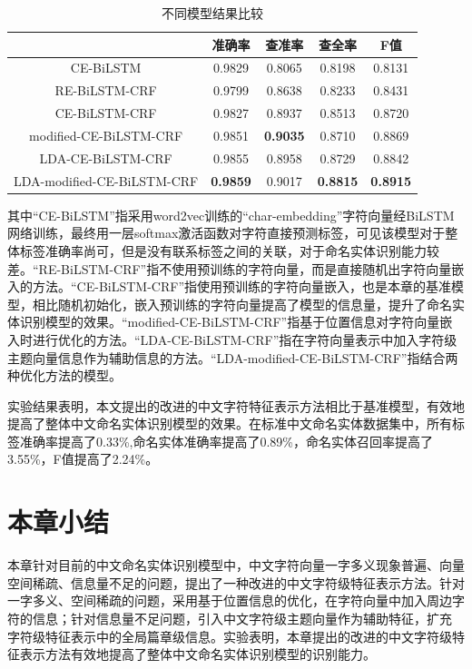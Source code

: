 \documentclass[winfonts,master,oneside,nobackinfo]{njuthesis}
\begin{document}
\begin{table}[h]
\centering
\begin{tabular}{|c|c|c|c|c|}
\hline
                           & 准确率 & 查准率 & 查全率& F值 \\ \hline
CE-BiLSTM             &     0.9829          &   0.8065             &  0.8198      &   0.8131    \\ \hline
RE-BiLSTM-CRF              &     0.9799          &   0.8638             &  0.8233      &   0.8431    \\ \hline
CE-BiLSTM-CRF              &     0.9827          &   0.8937           &    0.8513         & 0.8720   \\ \hline
modified-CE-BiLSTM-CRF     &     0.9851         &    \textbf{0.9035}            &   0.8710         & 0.8869  \\ \hline
LDA-CE-BiLSTM-CRF          &      0.9855         &    0.8958            &    0.8729         & 0.8842   \\ \hline
LDA-modified-CE-BiLSTM-CRF &      \textbf{0.9859}         &   0.9017             &  \textbf{0.8815}           &\textbf{0.8915}    \\ \hline
\end{tabular}
\caption{不同模型结果比较}
\label{all-model}
\end{table}

其中“CE-BiLSTM”指采用word2vec训练的“char-embedding”字符向量经BiLSTM网络训练，最终用一层softmax激活函数对字符直接预测标签，可见该模型对于整体标签准确率尚可，但是没有联系标签之间的关联，对于命名实体识别能力较差。“RE-BiLSTM-CRF”指不使用预训练的字符向量，而是直接随机出字符向量嵌入的方法。“CE-BiLSTM-CRF”指使用预训练的字符向量嵌入，也是本章的基准模型，相比随机初始化，嵌入预训练的字符向量提高了模型的信息量，提升了命名实体识别模型的效果。“modified-CE-BiLSTM-CRF”指基于位置信息对字符向量嵌入时进行优化的方法。“LDA-CE-BiLSTM-CRF”指在字符向量表示中加入字符级主题向量信息作为辅助信息的方法。“LDA-modified-CE-BiLSTM-CRF”指结合两种优化方法的模型。

实验结果表明，本文提出的改进的中文字符特征表示方法相比于基准模型，有效地提高了整体中文命名实体识别模型的效果。在标准中文命名实体数据集中，所有标签准确率提高了0.33\%,命名实体准确率提高了0.89\%，命名实体召回率提高了3.55\%，F值提高了2.24\%。

\section{本章小结}

本章针对目前的中文命名实体识别模型中，中文字符向量一字多义现象普遍、向量空间稀疏、信息量不足的问题，提出了一种改进的中文字符级特征表示方法。针对一字多义、空间稀疏的问题，采用基于位置信息的优化，在字符向量中加入周边字符的信息；针对信息量不足问题，引入中文字符级主题向量作为辅助特征，扩充 字符级特征表示中的全局篇章级信息。实验表明，本章提出的改进的中文字符级特征表示方法有效地提高了整体中文命名实体识别模型的识别能力。
\end{document}
